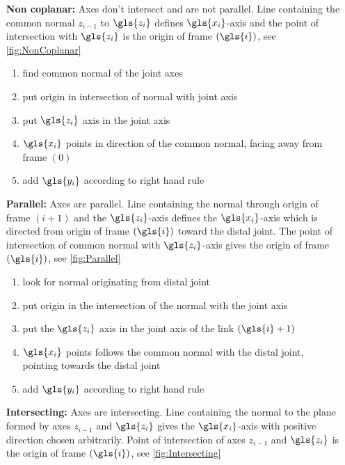 \begin{itemize}[wide=\parindent] %
	\item[\textbf{Non coplanar:}] Axes don't intersect and are not parallel. Line containing the common normal $z_{i-1}$ to $\gls{z_i}$ defines $\gls{x_i}$-axis and the point of intersection with $\gls{z_i}$ is the origin of frame $(\gls{i})$, see \ref{fig:NonCoplanar}
	\begin{enumerate}[label=\emph{\alph*)}]
		\item find common normal of the joint axes
		\item put origin in intersection of normal with joint axis
		\item put $\gls{z_i}$ axis in the joint axis
		\item $\gls{x_i}$ points in direction of the common normal, facing away from frame $(0)$
		\item add $\gls{y_i}$ according to right hand rule
	\end{enumerate}
	\item[\textbf{Parallel:}] Axes are parallel. Line containing the normal through origin of frame $(i+1)$ and the $\gls{z_i}$-axis defines the $\gls{x_i}$-axis which is directed from origin of frame $(\gls{i})$ toward the distal joint. The point of intersection of common normal with $\gls{z_i}$-axis gives the origin of frame $(\gls{i})$, see \ref{fig:Parallel} %
	\begin{enumerate}[label=\emph{\alph*)}]
		\item look for normal originating from distal joint
		\item put origin in the intersection of the normal with the joint axis
		\item put the $\gls{z_i}$ axis in the joint axis of the link $(\gls{i}+1)$ 
		\item $\gls{x_i}$ points follows the common normal with the distal joint, pointing towards the distal joint
		\item add $\gls{y_i}$ according to right hand rule
	\end{enumerate}
	\item[\textbf{Intersecting:}] Axes are intersecting. Line containing the normal to the plane formed by axes $z_{i-1}$ and  $\gls{z_i}$ gives the $\gls{x_i}$-axis with positive direction chosen arbitrarily. Point of intersection of  axes $z_{i-1}$  and  $\gls{z_i}$ is the origin of frame $(\gls{i})$, see \ref{fig:Intersecting}

\end{itemize}
